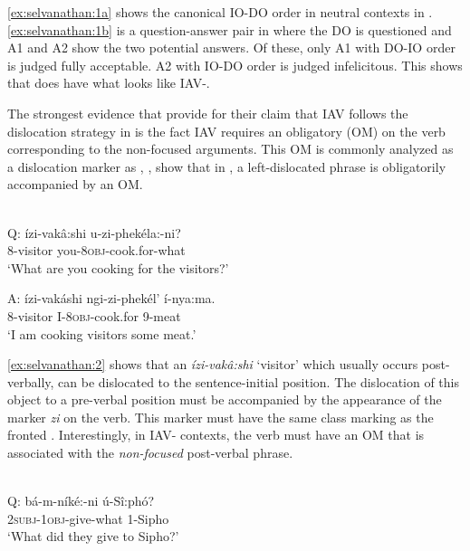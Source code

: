 \documentclass[output=paper
,newtxmath
,modfonts
,nonflat]{langsci/langscibook}
\begin{document}
\ref{ex:selvanathan:1a} shows the canonical IO-DO order in neutral contexts in . \ref{ex:selvanathan:1b} is a question-answer pair in  where the DO is questioned and A1 and A2 show the two potential answers. Of these, only A1 with DO-IO order is judged fully acceptable. A2 with IO-DO order is judged infelicitous. This shows that  does have what looks like IAV-. 

The strongest evidence that \citet{chengdowning2012} provide for their claim that  IAV  follows the dislocation strategy in  is the fact  IAV requires an obligatory  (OM) on the verb corresponding to the non-focused arguments. This OM is commonly analyzed as a dislocation marker as \citet{vanderSpuy1993}, \citet{Buell2005,Buell2006}, \citet{Halpert2012} show that in , a left-dislocated phrase is obligatorily accompanied by an OM.

\ea\label{ex:selvanathan:2}
\\
Q: \gll ízi-vakâ:shi  u-zi-phekéla:-ni? \\
	8-visitor      you-\textsc{8obj}{}-cook.for-what \\
\glt \-\hspace{0.5cm}`What are you cooking for the visitors?' 

A: \gll  ízi-vakáshi    ngi-zi-phekél’    í-nya:ma.\\
	8-visitor      I-\textsc{8obj}{}-cook.for    9-meat\\
\glt \-\hspace{0.5cm}`I am cooking visitors some meat.'
\z

\ref{ex:selvanathan:2} shows that an  \textit{ízi-vakâ:shi} ‘visitor’ which usually occurs post-verbally, can be dislocated to the sentence-initial position. The dislocation of this object to a pre-verbal position must be accompanied by the appearance of the marker \textit{zi} on the verb. This marker must have the same class marking as the fronted . Interestingly, in IAV- contexts, the verb must have an OM that is associated with the \textit{non-focused} post-verbal phrase.  

\ea\label{ex:selvanathan:3}
 \citep[4]{chengdowning2012}\\
Q: \gll bá-m-níké:-ni      ú-Sî:phó?\\ 
	\textsc{2subj}{}-\textsc{1obj}{}-give-what    1-Sipho\\ 
	\glt \-\hspace{0.5cm}`What did they give to Sipho?’
\end{document}
